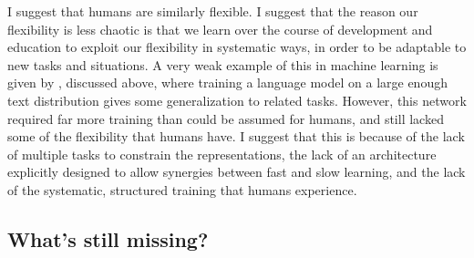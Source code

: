 I suggest that humans are similarly flexible. I suggest that the reason our flexibility is less chaotic is that we learn over the course of development and education to exploit our flexibility in systematic ways, in order to be adaptable to new tasks and situations. A very weak example of this in machine learning is given by \citet{Radford2019}, discussed above, where training a language model on a large enough text distribution gives some generalization to related tasks. However, this network required far more training than could be assumed for humans, and still lacked some of the flexibility that humans have. I suggest that this is because of the lack of multiple tasks to constrain the representations, the lack of an architecture explicitly designed to allow synergies between fast and slow learning, and the lack of the systematic, structured training that humans experience. \par 

\subsection{What's still missing?}

